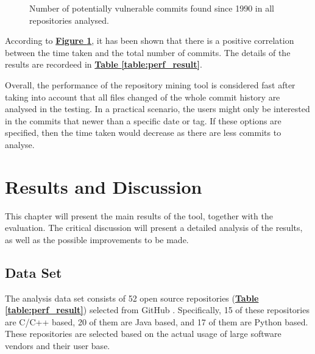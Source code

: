\documentclass[12pt, a4paper]{report}
\begin{document}
\begin{figure}[H]
  \centering
  \caption{Number of potentially vulnerable commits found since 1990 in all repositories analysed.}
  \label{figure:perf_result}
\end{figure}

According to \hyperref[figure:perf_result]{\textbf{Figure \ref*{figure:perf_result}}}, it has been
shown that there is a positive correlation between the time taken and the total number of commits.
The details of the results are recordeed in \hyperref[table:perf_result]{\textbf{Table
\ref*{table:perf_result}}}.

Overall, the performance of the repository mining tool is considered fast after taking into account
that all files changed of the whole commit history are analysed in the testing. In a practical
scenario, the users might only be interested in the commits that newer than a specific date or tag.
If these options are specified, then the time taken would decrease as there are less commits to
analyse.

\chapter{Results and Discussion}
This chapter will present the main results of the tool, together with the evaluation. The critical
discussion will present a detailed analysis of the results, as well as the possible improvements to
be made.

\section{Data Set}
The analysis data set consists of 52 open source repositories
(\hyperref[table:perf_result]{\textbf{Table \ref*{table:perf_result}}}) selected from GitHub
\cite{github}. Specifically, 15 of these repositories are C/C++ based, 20 of them are Java based,
and 17 of them are Python based. These repositories are selected based on the actual usage of large
software vendors and their user base.
\end{document}
